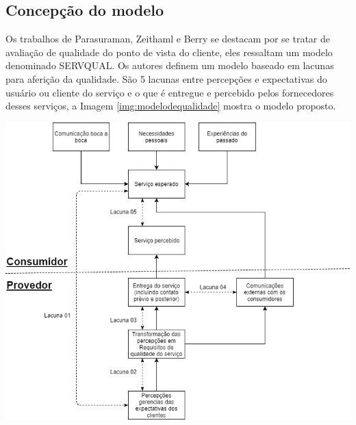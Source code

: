 \subsection{Concepção do modelo}
Os trabalhos de Parasuraman, Zeithaml e Berry se destacam por se tratar de avaliação de qualidade do ponto de vista do cliente, eles ressaltam um modelo denominado SERVQUAL\cite{parasuraman1985}. Os autores definem um modelo baseado em lacunas para aferição da qualidade. São 5 lacunas entre percepções e expectativas do usuário ou cliente do serviço e o que é entregue e percebido pelos fornecedores desses serviços, a Imagem \ref{img:modelodequalidade} mostra o modelo proposto.
\begin{center}
	\includegraphics[width=.75\linewidth]{figuras/modelodequalidade.jpg}
	\label{img:modelodequalidade}
\end{center}

